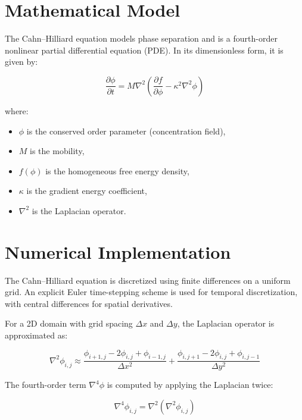 \documentclass[11pt,a4paper]{article}
\begin{document}
	\section{Mathematical Model}
	\label{sec:math}
	
	The Cahn–Hilliard equation models phase separation and is a fourth-order nonlinear partial differential equation (PDE). In its dimensionless form, it is given by:
	
	\begin{equation}
		\frac{\partial \phi}{\partial t} = M \nabla^2 \left( \frac{\partial f}{\partial \phi} - \kappa^2 \nabla^2 \phi \right)
		\label{eq:ch}
	\end{equation}
	
	where:
	\begin{itemize}
		\item \(\phi\) is the conserved order parameter (concentration field),
		\item \(M\) is the mobility,
		\item \(f(\phi)\) is the homogeneous free energy density,
		\item \(\kappa\) is the gradient energy coefficient,
		\item \(\nabla^2\) is the Laplacian operator.
	\end{itemize}
	
	\section{Numerical Implementation}
	
	The Cahn–Hilliard equation is discretized using finite differences on a uniform grid. An explicit Euler time-stepping scheme is used for temporal discretization, with central differences for spatial derivatives.
	
	For a 2D domain with grid spacing \(\Delta x\) and \(\Delta y\), the Laplacian operator is approximated as:
	
	\begin{equation}
		\nabla^2 \phi_{i,j} \approx \frac{\phi_{i+1,j} - 2\phi_{i,j} + \phi_{i-1,j}}{\Delta x^2} + \frac{\phi_{i,j+1} - 2\phi_{i,j} + \phi_{i,j-1}}{\Delta y^2}
		\label{eq:laplacian}
	\end{equation}
	
	The fourth-order term \(\nabla^4 \phi\) is computed by applying the Laplacian twice:
	
	\begin{equation}
		\nabla^4 \phi_{i,j} = \nabla^2 \left( \nabla^2 \phi_{i,j} \right)
		\label{eq:nabla4}
	\end{equation}
	
\end{document}
